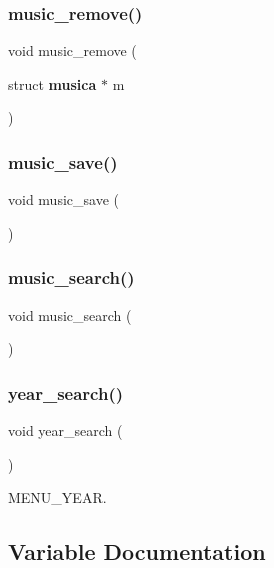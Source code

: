 \mbox{\label{project_8h_a3ed1d066f06b3b8ce2416cf4418231f9}} 
\subsubsection{music\_remove()}
{\footnotesize\ttfamily void music\+\_\+remove (\begin{DoxyParamCaption}\item[{struct \textbf{ musica} $\ast$}]{m }\end{DoxyParamCaption})}

\mbox{\label{project_8h_aca4dc8bca342d560906d9c5a375e5b52}} 
\subsubsection{music\_save()}
{\footnotesize\ttfamily void music\+\_\+save (\begin{DoxyParamCaption}{ }\end{DoxyParamCaption})}

\mbox{\label{project_8h_acd2ed77d07ab0a38a48ff3e12e405a37}} 
\subsubsection{music\_search()}
{\footnotesize\ttfamily void music\+\_\+search (\begin{DoxyParamCaption}{ }\end{DoxyParamCaption})}

\mbox{\label{project_8h_aefb0e0039c204086395ce878ebc4cac0}} 
\subsubsection{year\_search()}
{\footnotesize\ttfamily void year\+\_\+search (\begin{DoxyParamCaption}{ }\end{DoxyParamCaption})}



M\+E\+N\+U\+\_\+\+Y\+E\+AR. 



\subsection{Variable Documentation}
\mbox{\label{project_8h_a8d82d06e41678bc11a48e87a03a015c4}} 
